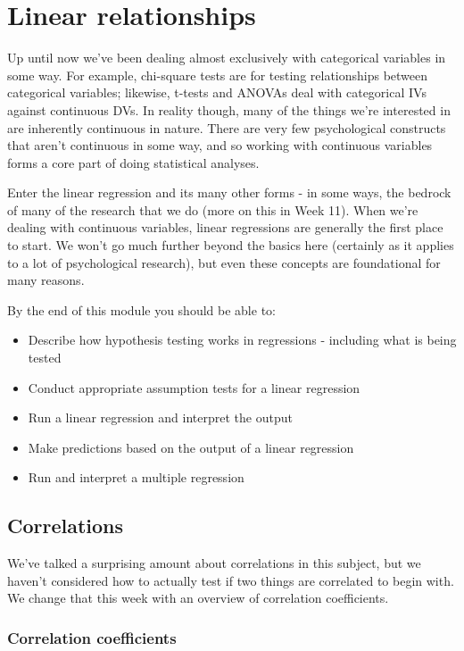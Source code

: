 \documentclass[
]{book}
\providecommand{\tightlist}{%
  \setlength{\itemsep}{0pt}\setlength{\parskip}{0pt}}
\begin{document}
\chapter{Linear relationships}\label{linear-relationships}

Up until now we've been dealing almost exclusively with categorical variables in some way. For example, chi-square tests are for testing relationships between categorical variables; likewise, t-tests and ANOVAs deal with categorical IVs against continuous DVs. In reality though, many of the things we're interested in are inherently continuous in nature. There are very few psychological constructs that aren't continuous in some way, and so working with continuous variables forms a core part of doing statistical analyses.

Enter the linear regression and its many other forms - in some ways, the bedrock of many of the research that we do (more on this in Week 11). When we're dealing with continuous variables, linear regressions are generally the first place to start. We won't go much further beyond the basics here (certainly as it applies to a lot of psychological research), but even these concepts are foundational for many reasons.

By the end of this module you should be able to:

\begin{itemize}
\tightlist
\item
  Describe how hypothesis testing works in regressions - including what is being tested
\item
  Conduct appropriate assumption tests for a linear regression
\item
  Run a linear regression and interpret the output
\item
  Make predictions based on the output of a linear regression
\item
  Run and interpret a multiple regression
\end{itemize}

\section{Correlations}\label{correlations}

We've talked a surprising amount about correlations in this subject, but we haven't considered how to actually test if two things are correlated to begin with. We change that this week with an overview of correlation coefficients.

\subsection{Correlation coefficients}\label{correlation-coefficients}
\end{document}
